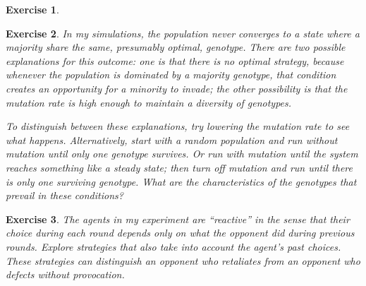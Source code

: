 \documentclass[12pt]{book}
\theoremstyle{exercise}
\newtheorem{exercise}{Exercise}[chapter]
\newcommand{\py}{\verb}%}
\begin{document}
\begin{exercise}

\end{exercise}

\begin{exercise}

In my simulations, the population never converges to a state where a majority share the same, presumably optimal, genotype. There are two possible explanations for this outcome: one is that there is no optimal strategy, because whenever the population is dominated by a majority genotype, that condition creates an opportunity for a minority to invade; the other possibility is that the mutation rate is high enough to maintain a diversity of genotypes.

To distinguish between these explanations, try lowering the mutation rate to see what happens. Alternatively, start with a random population and run without mutation until only one genotype survives. Or run with mutation until the system reaches something like a steady state; then turn off mutation and run until there is only one surviving genotype. What are the characteristics of the genotypes that prevail in these conditions?

\end{exercise}


\begin{exercise}

The agents in my experiment are ``reactive'' in the sense that their
choice during each round depends only on what the opponent did during
previous rounds.  Explore strategies that also take into
account the agent's past choices.  These strategies can
distinguish an opponent who retaliates from an opponent who defects
without provocation.


\end{exercise}
\end{document}
